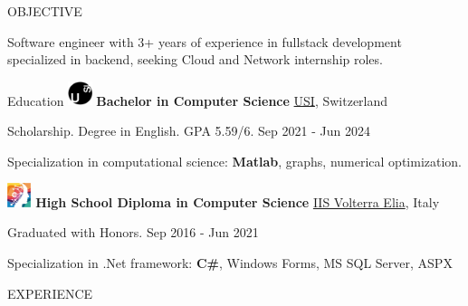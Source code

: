 \documentclass{cv} %
\def\intraexpvspace{0.15cm}
\begin{document}
\begin{minipage}[b][0.9\paperheight][t]{0.7\linewidth}

    \headline

    \begin{rSection}{OBJECTIVE}
        \item Software engineer with 3+ years of experience in fullstack development specialized in backend,
        seeking Cloud and Network internship roles.
    \end{rSection}

    \begin{rSection}{Education}
        \vspace{0.2cm}
        \includegraphics[width=0.7cm, trim={0cm 10cm 0cm 0cm}]{usi-icon.png}
        {\bf Bachelor in Computer Science}
        \hfill \href{https://www.usi.ch/en}{USI}, Switzerland
        \item \hspace{0.85cm}Scholarship. Degree in English. GPA 5.59/6.
        \hfill {Sep 2021 - Jun 2024}
        \item Specialization in computational science: \textbf{Matlab}, graphs, numerical optimization.
        \vspace{\intraexpvspace}
        \vspace{\intraexpvspace}

        \includegraphics[width=0.7cm, trim={0cm 2.2cm 0cm 0cm}]{iisve-icon.png}
        {\bf High School Diploma in Computer Science}
        \hfill \href{https://www.istitutovolterraelia.it/}{IIS Volterra Elia}, Italy
        \item \hspace{0.85cm}Graduated with Honors.
        \hfill {Sep 2016 - Jun 2021}
        \item Specialization in .Net framework: \textbf{C\#}, Windows Forms, MS SQL Server, ASPX
    \end{rSection}
    \begin{rSection}{EXPERIENCE}
        \vspace{0.2cm}


\end{rSection}
\end{minipage}
\end{document}
